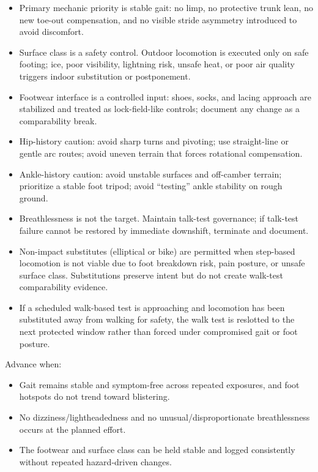 \documentclass[10pt]{article}
\begin{document}
\begin{itemize}
\item Primary mechanic priority is stable gait: no limp, no protective trunk lean, no new toe-out compensation, and no visible stride asymmetry introduced to avoid discomfort.
\item Surface class is a safety control. Outdoor locomotion is executed only on safe footing; ice, poor visibility, lightning risk, unsafe heat, or poor air quality triggers indoor substitution or postponement.
\item Footwear interface is a controlled input: shoes, socks, and lacing approach are stabilized and treated as lock-field-like controls; document any change as a comparability break.
\item Hip-history caution: avoid sharp turns and pivoting; use straight-line or gentle arc routes; avoid uneven terrain that forces rotational compensation.
\item Ankle-history caution: avoid unstable surfaces and off-camber terrain; prioritize a stable foot tripod; avoid “testing” ankle stability on rough ground.
\item Breathlessness is not the target. Maintain talk-test governance; if talk-test failure cannot be restored by immediate downshift, terminate and document.
\item Non-impact substitutes (elliptical or bike) are permitted when step-based locomotion is not viable due to foot breakdown risk, pain posture, or unsafe surface class. Substitutions preserve intent but do not create walk-test comparability evidence.
\item If a scheduled walk-based test is approaching and locomotion has been substituted away from walking for safety, the walk test is reslotted to the next protected window rather than forced under compromised gait or foot posture.
\end{itemize}

Advance when:

\begin{itemize}
\item Gait remains stable and symptom-free across repeated exposures, and foot hotspots do not trend toward blistering.
\item No dizziness/lightheadedness and no unusual/disproportionate breathlessness occurs at the planned effort.
\item The footwear and surface class can be held stable and logged consistently without repeated hazard-driven changes.
\end{itemize}
\end{document}
